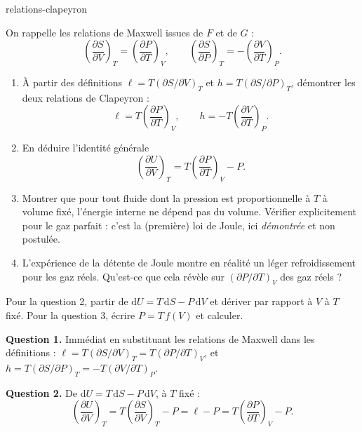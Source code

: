 \begin{exo}{relations-clapeyron}

On rappelle les relations de Maxwell issues de $F$ et de $G$ :
\[
\left(\frac{\partial S}{\partial V}\right)_T = \left(\frac{\partial P}{\partial T}\right)_V, \qquad
\left(\frac{\partial S}{\partial P}\right)_T = -\left(\frac{\partial V}{\partial T}\right)_P.
\]

\begin{enumerate}
\item À partir des définitions $\ell = T\left(\partial S/\partial V\right)_T$ et $h = T\left(\partial S/\partial P\right)_T$, démontrer les deux relations de Clapeyron :
\[
\ell = T\left(\frac{\partial P}{\partial T}\right)_V, \qquad h = -T\left(\frac{\partial V}{\partial T}\right)_P.
\]
\item En déduire l'identité générale
\[
\left(\frac{\partial U}{\partial V}\right)_T = T\left(\frac{\partial P}{\partial T}\right)_V - P.
\]
\item Montrer que pour tout fluide dont la pression est proportionnelle à $T$ à volume fixé, l'énergie interne ne dépend pas du volume. Vérifier explicitement pour le gaz parfait : c'est la (première) loi de Joule, ici \emph{démontrée} et non postulée.
\item L'expérience de la détente de Joule montre en réalité un léger refroidissement pour les gaz réels. Qu'est-ce que cela révèle sur $\left(\partial P/\partial T\right)_V$ des gaz réels ?
\end{enumerate}

\begin{indication}
Pour la question 2, partir de $\mathrm{d}U = T\,\mathrm{d}S - P\,\mathrm{d}V$ et dériver par rapport à $V$ à $T$ fixé. Pour la question 3, écrire $P = T\,f(V)$ et calculer.
\end{indication}

\begin{solution}
\textbf{Question 1.} Immédiat en substituant les relations de Maxwell dans les définitions : $\ell = T\left(\partial S/\partial V\right)_T = T\left(\partial P/\partial T\right)_V$, et $h = T\left(\partial S/\partial P\right)_T = -T\left(\partial V/\partial T\right)_P$.

\textbf{Question 2.} De $\mathrm{d}U = T\,\mathrm{d}S - P\,\mathrm{d}V$, à $T$ fixé :
\[
\left(\frac{\partial U}{\partial V}\right)_T = T\left(\frac{\partial S}{\partial V}\right)_T - P = \ell - P = T\left(\frac{\partial P}{\partial T}\right)_V - P.
\]


\end{solution}
\end{exo}
